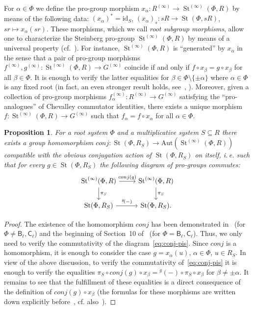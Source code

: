 \documentclass[oneside, 11pt]{amsart} \pdfoutput=1
\newcommand{\St}{\mathop{\mathrm{St}}\nolimits}
\numberwithin{equation}{section}
\newtheorem{prop}[lemma]{Proposition}
\theoremstyle{definition}
\newcommand{\rB}{\mathsf{B}}
\newcommand{\rC}{\mathsf{C}}
\begin{document}
For $\alpha \in \Phi$ we define the pro-group morphism $x_\alpha \colon R^{(\infty)} \to \St^{(\infty)}(\Phi, R)$ by means of the following data: $(x_\alpha)^* = \mathrm{id}_S$, $(x_\alpha)_s \colon sR \to \St(\Phi, sR)$, $sr \mapsto x_\alpha(sr)$. These morphisms, which we call {\it root subgroup morphisms}, allow one to characterize the Steinberg pro-group $\St^{(\infty)}(\Phi, R)$ by means of a universal property (cf.~\cite[Lemma~2.16]{LSV20}). For instance, $\St^{(\infty)}(\Phi, R)$ is ``generated'' by $x_\alpha$ in the sense that a pair of pro-group morphisms $f^{(\infty)}, g^{(\infty)} \colon \St^{(\infty)}(\Phi, R) \to G^{(\infty)}$ coincide if and only if $f \circ x_\beta = g \circ x_\beta$ for all $\beta \in \Phi$.
It is enough to verify the latter equalities for $\beta \in \Phi\setminus\{\pm \alpha\}$ where $\alpha \in \Phi$ is any fixed root (in fact, an even stronger result holds, see~\cite[Lemma~3.2]{LSV20}, \cite[Lemma~11]{V20}).
Moreover, given a collection of pro-group morphisms $f_\alpha^{(\infty)} \colon R^{(\infty)} \to G^{(\infty)}$ satisfying the ``pro-analogues'' of Chevalley commutator identities, there exists a unique morphism $f \colon \St^{(\infty)}(\Phi, R) \to G^{(\infty)}$ such that $f_\alpha = f \circ x_\alpha$ for all $\alpha\in\Phi$. 
\begin{prop}\label{prop:conj-action}
 For a root system $\Phi$ and a multiplicative system $S\subseteq R$ there exists a group homomorphism $conj\colon \St(\Phi, R_S) \to \mathrm{Aut}(\St^{(\infty)}(\Phi, R))$ compatible with the obvious conjugation action of $\St(\Phi, R_S)$ on itself, i.\,e. such that for every $g \in \St(\Phi, R_S)$ the following diagram of pro-groups commutes:
 \begin{equation} \label{eq:conj-pis} \begin{tikzcd} \St^{(\infty)}(\Phi, R) \ar{r}{conj(g)} \ar{d}{\pi_S} & \St^{(\infty)}(\Phi, R) \ar{d}{\pi_S} \\ \St(\Phi, R_S) \ar{r}{{}^g\!(-)} & \St(\Phi, R_S). \end{tikzcd} \end{equation}
\end{prop}
\begin{proof}
The existence of the homomorphism $conj$ has been demonstrated in~\cite[Proposition~4.2]{LSV20} (for $\Phi\neq\rB_\ell, \rC_\ell$) and the beginning of Section~10 of~\cite{V20} (for $\Phi=\rB_\ell, \rC_\ell$). Thus, we only need to verify the commutativity of the diagram~\eqref{eq:conj-pis}. 
Since $conj$ is a homomorphism, it is enough to consider the case $g = x_\alpha(u)$, $\alpha \in \Phi$, $u \in R_S$. In view of the above discussion, to verify the commutativity of~\eqref{eq:conj-pis} it is enough to verify the equalities $\pi_S \circ conj(g) \circ x_\beta= {}^g\!(-) \circ \pi_S \circ x_\beta$ for $\beta\neq \pm\alpha$.
 It remains to see that the fulfillment of these equalities is a direct consequence of the definition of $conj(g) \circ x_\beta$ (the formulas for these morphisms are written down explicitly before~\cite[Proposition~4.2]{LSV20}, cf. also~\cite[\S~10]{V20}). \end{proof}
\end{document}
